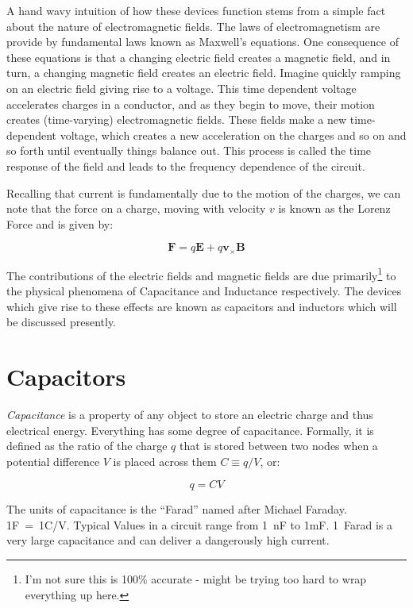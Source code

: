 \documentclass{tufte-book}
\begin{document}
A hand wavy intuition of how these devices function stems from a simple fact about the nature of electromagnetic fields. The laws of electromagnetism are provide by fundamental laws known as Maxwell's equations. One consequence of these equations is that a changing electric field creates a magnetic field, and in turn, a changing magnetic field creates an electric field. Imagine quickly ramping on an electric field giving rise to a voltage. This time dependent voltage accelerates charges in a conductor, and as they begin to move, their motion creates (time-varying) electromagnetic fields. These fields make a new time-dependent voltage, which creates a new acceleration on the charges and so on and so forth until eventually things balance out. This process is called the time response of the field and leads to the frequency dependence of the circuit.

Recalling that current is fundamentally due to the motion of the charges, we can note that the force on a charge, moving with velocity $v$ is known as the Lorenz Force and is given by:

\begin{equation}\label{eq:Lorenz}
\textbf{F} = q\textbf{E} + q\textbf{v}_\times\textbf{B}
\end{equation}

\noindent The contributions of the electric fields and magnetic fields are due primarily\footnote{I'm not sure this is 100\% accurate - might be trying too hard to wrap everything up here.} to the physical phenomena of Capacitance and Inductance respectively. The devices which give rise to these effects are known as capacitors and inductors which will be discussed presently.

\section{Capacitors}
\textit{Capacitance} is a property of any object to store an electric charge and thus electrical energy. Everything has some degree of capacitance. Formally, it is defined as the ratio of the charge $q$ that is stored between two nodes when a potential difference $V$ is placed across them $C\equiv q/V$, or:

\begin{equation}\label{def:capacitance}
q = CV
\end{equation}

\noindent The units of capacitance is the ``Farad'' named after Michael Faraday. 1F~=~1C/V. Typical Values in a circuit range from 1~nF to 1mF. 1~Farad is a very large capacitance and can deliver a dangerously high current.
\end{document}

